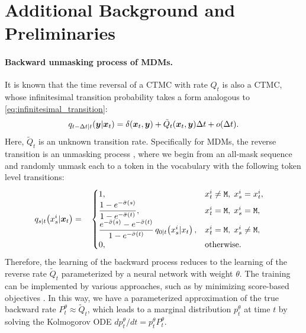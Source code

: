 \appendix

\section{Additional Background and Preliminaries}\label{sec:literature-appendix}

\paragraph{Backward unmasking process of MDMs.}
It is known that the time reversal of a CTMC with rate $Q_t$ is also a CTMC, whose infinitesimal transition probability takes a form analogous to \eqref{eq:infinitesimal_transition}:
\begin{equation}
\label{eq:infinitesimal_transition_rev}
    q_{t-\Delta t|t}({\bm{y}}|{\bm{x}}_t)  =  \delta({\bm{x}}_t, {\bm{y}}) + \tilde{Q}_t({\bm{x}}_t, {\bm{y}}) \Delta t + o(\Delta t).
\end{equation}
Here, $\tilde Q_t$ is an unknown transition rate. Specifically for MDMs, the reverse transition is an unmasking process \citep{lou2024discrete,campbell2022continuous,ou2025absorbingdiscretediffusionsecretly}, where we begin from an all-mask sequence and randomly unmask each to a token in the vocabulary with the following token level transitions:
\begin{align*}
    q_{s|t}\!\left(x_s^{i}|\bm x_t\right)
=
&\quad \begin{cases}
1,
& x_t^{i} \neq \texttt{M},\; x_s^{i} = x_t^{i}, \\
\dfrac{1 - e^{-\bar{\sigma}(s)}}{1 - e^{-\bar{\sigma}(t)}},
& x_t^{i} = \texttt{M},\; x_s^{i} = \texttt{M}, \\
\dfrac{e^{-\bar{\sigma}(s)} - e^{-\bar{\sigma}(t)}}{1 - e^{-\bar{\sigma}(t)}}\,
q_{0 | t}\!\left(x_s^{i}|x_t\right),
& x_t^{i} = \texttt{M},\; x_s^{i} \neq \texttt{M}, \\
0,
& \text{otherwise}.
\end{cases}
\end{align*}
Therefore, the learning of the backward process reduces to the learning of the reverse rate $\tilde Q_t$ parameterized by a neural network with weight $\theta$. The training can be implemented by various approaches, such as by minimizing score-based objectives \citep{lou2024discrete,ou2025absorbingdiscretediffusionsecretly}. In this way, we have a parameterized approximation of the true backward rate $P_t^\theta\approx \tilde Q_t$, which leads to a marginal distribution $p_t^\theta$ at time $t$ by solving the Kolmogorov ODE $dp^\theta_t/dt=p_t^\theta P_t^\theta$.

